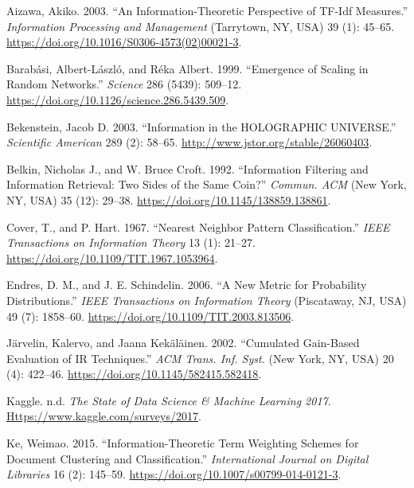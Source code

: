 \documentclass[
  letterpaper,
]{scrbook}
\newlength{\cslhangindent}
\newenvironment{CSLReferences}[2] %
 {\begin{list}{}{%
  \setlength{\itemindent}{0pt}
  \setlength{\leftmargin}{0pt}
  \setlength{\parsep}{0pt}
  \ifodd #1
   \setlength{\leftmargin}{\cslhangindent}
   \setlength{\itemindent}{-1\cslhangindent}
  \fi
  \setlength{\itemsep}{#2\baselineskip}}}
 {\end{list}}
\begin{document}
\protect{}\label{refs}
\begin{CSLReferences}{1}{1}
Aizawa, Akiko. 2003. {``An Information-Theoretic Perspective of TF-Idf
Measures.''} \emph{Information Processing and Management} (Tarrytown,
NY, USA) 39 (1): 45--65.
\url{https://doi.org/10.1016/S0306-4573(02)00021-3}.

Barabási, Albert-László, and Réka Albert. 1999. {``Emergence of Scaling
in Random Networks.''} \emph{Science} 286 (5439): 509--12.
\url{https://doi.org/10.1126/science.286.5439.509}.

Bekenstein, Jacob D. 2003. {``Information in the HOLOGRAPHIC
UNIVERSE.''} \emph{Scientific American} 289 (2): 58--65.
\url{http://www.jstor.org/stable/26060403}.

Belkin, Nicholas J., and W. Bruce Croft. 1992. {``Information Filtering
and Information Retrieval: Two Sides of the Same Coin?''} \emph{Commun.
ACM} (New York, NY, USA) 35 (12): 29--38.
\url{https://doi.org/10.1145/138859.138861}.

Cover, T., and P. Hart. 1967. {``Nearest Neighbor Pattern
Classification.''} \emph{IEEE Transactions on Information Theory} 13
(1): 21--27. \url{https://doi.org/10.1109/TIT.1967.1053964}.

Endres, D. M., and J. E. Schindelin. 2006. {``A New Metric for
Probability Distributions.''} \emph{IEEE Transactions on Information
Theory} (Piscataway, NJ, USA) 49 (7): 1858--60.
\url{https://doi.org/10.1109/TIT.2003.813506}.

Järvelin, Kalervo, and Jaana Kekäläinen. 2002. {``Cumulated Gain-Based
Evaluation of IR Techniques.''} \emph{ACM Trans. Inf. Syst.} (New York,
NY, USA) 20 (4): 422--46. \url{https://doi.org/10.1145/582415.582418}.

Kaggle. n.d. \emph{The State of Data Science \& Machine Learning 2017}.
\href{https://www.kaggle.com/surveys/2017}{Https://www.kaggle.com/surveys/2017}.

Ke, Weimao. 2015. {``Information-Theoretic Term Weighting Schemes for
Document Clustering and Classification.''} \emph{International Journal
on Digital Libraries} 16 (2): 145--59.
\url{https://doi.org/10.1007/s00799-014-0121-3}.


\end{CSLReferences}
\end{document}
